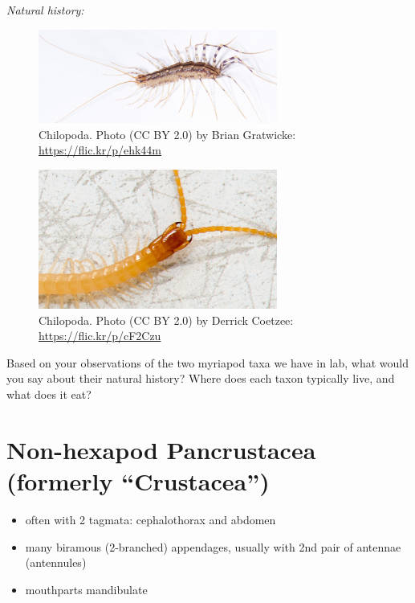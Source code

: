 \documentclass[letterpaper, 11pt]{article}
\begin{document}
\noindent{}\textit{Natural history:} \\

\begin{figure}[ht!]
    \centering
        \includegraphics[width=0.7\textwidth]{chilo1}
        \caption{Chilopoda. Photo (CC BY 2.0) by Brian Gratwicke: \url{https://flic.kr/p/ehk44m}}
        \label{fig:chilo1}
\end{figure}

\begin{figure}[ht!]
	\centering
        \includegraphics[width=0.7\textwidth]{chilo2}
        \caption{Chilopoda. Photo (CC BY 2.0) by Derrick Coetzee: \url{https://flic.kr/p/cF2Czu}}
        \label{fig:chilo2}
\end{figure}

\noindent{}Based on your observations of the two myriapod taxa we have in lab, what would you say about their natural history? Where does each taxon typically live, and what does it eat?\vspace{4cm}

\section{Non-hexapod Pancrustacea (formerly ``Crustacea'')}
\begin{itemize}
\item often with 2 tagmata: cephalothorax and abdomen
\item many biramous (2-branched) appendages, usually with 2nd pair of antennae (antennules)
\item mouthparts mandibulate
\end{itemize}
\end{document}
